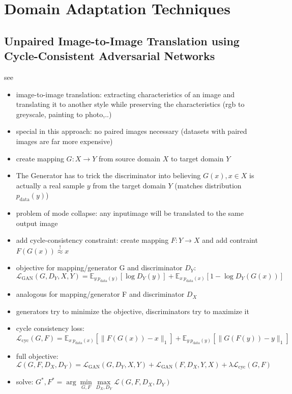 \chapter{Domain Adaptation Techniques}
\label{sec:techniques}

\section{Unpaired Image-to-Image Translation using Cycle-Consistent Adversarial Networks}
see \cite{DBLP:journals/corr/ZhuPIE17}

\begin{itemize}
	\item image-to-image translation: extracting characteristics of an image and translating it to another style while preserving the characteristics (rgb to greyscale, painting to photo,..)
	\item special in this approach: no paired images necessary (datasets with paired images are far more expensive)
	\item create mapping $G: X \rightarrow Y$ from source domain $X$ to target domain $Y$
	\item The Generator has to trick the discriminator into believing $G(x), x \in X$ is actually a real sample $y$ from the target domain $Y$ (matches distribution $p_{\text{data}}(y)$)
	\item problem of mode collapse: any inputimage will be translated to the same output image
	\item add cycle-consistency constraint: create mapping $F: Y \rightarrow X$ and add contraint $F(G(x)) \overset{!}{\approx} x$ 
	\item objective for mapping/generator G and discriminator $D_Y$: \\
	$\mathcal{L}_{\text{GAN}}(G, D_Y, X, Y) = \mathbb{E}_{y~p_{\text{data}}(y)}[\log D_Y(y)] + \mathbb{E}_{x~p_{\text{data}}(x)}[1 - \log D_Y(G(x))]$
	\item analogous for mapping/generator F and discriminator $D_X$
	\item generators try to minimize the objective, discriminators try to maximize it
	\item cycle consistency loss:\\
	$\mathcal{L}_{\text{cyc}}(G, F) =  \mathbb{E}_{x~p_{\text{data}}(x)} [\lVert F(G(x))- x \rVert_1] + \mathbb{E}_{y~p_{\text{data}}(y)} [\lVert G(F(y))- y \rVert_1]$
	\item full objective:\\
	$\mathcal{L}(G,F,D_X,D_Y) = \mathcal{L}_{\text{GAN}}(G, D_Y, X, Y) + \mathcal{L}_{\text{GAN}}(F, D_X, Y, X) + \lambda \mathcal{L}_{\text{cyc}}(G, F)$
	\item solve: $G^*, F^* = \arg \underset{G,F}{\min}\underset{D_X, D_Y}{\max} \mathcal{L}(G,F,D_X,D_Y)$
\end{itemize}